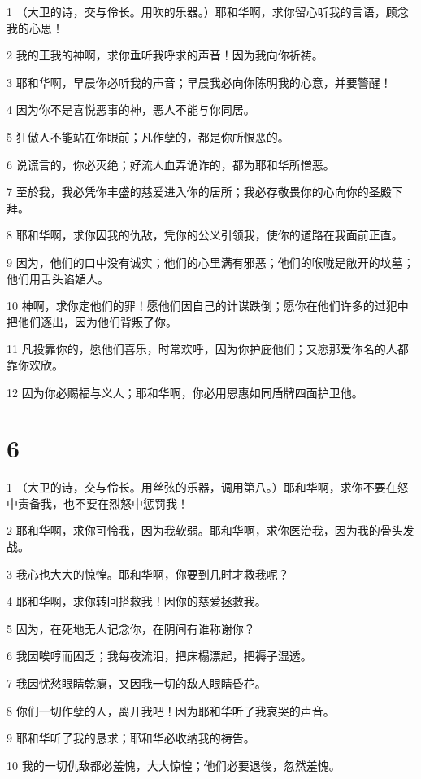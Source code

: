 \par 1 （大卫的诗，交与伶长。用吹的乐器。）耶和华啊，求你留心听我的言语，顾念我的心思！
\par 2 我的王我的神啊，求你垂听我呼求的声音！因为我向你祈祷。
\par 3 耶和华啊，早晨你必听我的声音；早晨我必向你陈明我的心意，并要警醒！
\par 4 因为你不是喜悦恶事的神，恶人不能与你同居。
\par 5 狂傲人不能站在你眼前；凡作孽的，都是你所恨恶的。
\par 6 说谎言的，你必灭绝；好流人血弄诡诈的，都为耶和华所憎恶。
\par 7 至於我，我必凭你丰盛的慈爱进入你的居所；我必存敬畏你的心向你的圣殿下拜。
\par 8 耶和华啊，求你因我的仇敌，凭你的公义引领我，使你的道路在我面前正直。
\par 9 因为，他们的口中没有诚实；他们的心里满有邪恶；他们的喉咙是敞开的坟墓；他们用舌头谄媚人。
\par 10 神啊，求你定他们的罪！愿他们因自己的计谋跌倒；愿你在他们许多的过犯中把他们逐出，因为他们背叛了你。
\par 11 凡投靠你的，愿他们喜乐，时常欢呼，因为你护庇他们；又愿那爱你名的人都靠你欢欣。
\par 12 因为你必赐福与义人；耶和华啊，你必用恩惠如同盾牌四面护卫他。

\chapter{6}

\par 1 （大卫的诗，交与伶长。用丝弦的乐器，调用第八。）耶和华啊，求你不要在怒中责备我，也不要在烈怒中惩罚我！
\par 2 耶和华啊，求你可怜我，因为我软弱。耶和华啊，求你医治我，因为我的骨头发战。
\par 3 我心也大大的惊惶。耶和华啊，你要到几时才救我呢？
\par 4 耶和华啊，求你转回搭救我！因你的慈爱拯救我。
\par 5 因为，在死地无人记念你，在阴间有谁称谢你？
\par 6 我因唉哼而困乏；我每夜流泪，把床榻漂起，把褥子湿透。
\par 7 我因忧愁眼睛乾瘪，又因我一切的敌人眼睛昏花。
\par 8 你们一切作孽的人，离开我吧！因为耶和华听了我哀哭的声音。
\par 9 耶和华听了我的恳求；耶和华必收纳我的祷告。
\par 10 我的一切仇敌都必羞愧，大大惊惶；他们必要退後，忽然羞愧。


